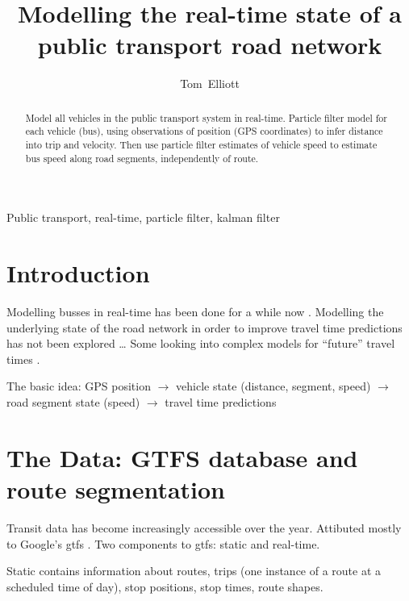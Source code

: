 \documentclass[draftcls,a4paper,onecolumn]{IEEEtran}\usepackage[]{graphicx}\usepackage[]{color}
\title{Modelling the real-time state of a public transport road network}
\author{Tom~Elliott}
\begin{document}
\maketitle


\begin{abstract}
  Model all vehicles in the public transport system in real-time.
  Particle filter model for each vehicle (bus),
  using observations of position (GPS coordinates) to infer distance into trip
  and velocity.
  Then use particle filter estimates of vehicle speed to estimate bus speed along
  road segments, independently of route.
 
\end{abstract}



\begin{IEEEkeywords}
  Public transport, real-time, particle filter, kalman filter
\end{IEEEkeywords}

\section{Introduction}
\label{sec:intro}


Modelling busses in real-time has been done for a while now 
\cite{Cats_2015,Chen_2014,Hans_2015,Jeong_2005,TCRP_2003,Wessel_2016,Xinghao_2013}.
Modelling the underlying state of the road network in order to improve 
travel time predictions has not been explored \ldots
Some looking into complex models for ``future'' travel times 
\cite{Julio_2016,Xinghao_2013,Yichen_Zheng_2016,Yu_2011}.


The basic idea:
GPS position $\rightarrow$ 
vehicle state (distance, segment, speed) $\rightarrow$
road segment state (speed) $\rightarrow$
travel time predictions



\section{The Data: GTFS database and route segmentation}
\label{sec:data}

Transit data has become increasingly accessible over the year.
Attibuted mostly to Google's \gls{gtfs} \cite{GoogleDevelopers_2006}.
Two components to \gls{gtfs}: static and real-time.

Static contains information about routes, trips (one instance of a route at a scheduled time of day),
stop positions, stop times, route shapes.
\end{document}

